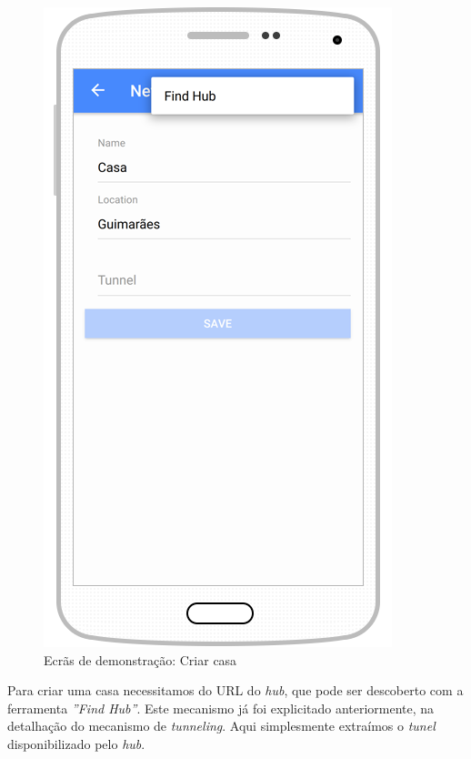 \begin{figure}[H]
  \centering
        \includegraphics[scale=0.75]{img/demo/create_home.png}
  \caption{Ecrãs de demonstração: Criar casa}
\end{figure}

Para criar uma casa necessitamos do URL do \textit{hub}, que pode ser descoberto com a ferramenta \textit{''Find Hub''}. Este mecanismo já foi explicitado anteriormente, na detalhação do mecanismo de \textit{tunneling}. Aqui simplesmente extraímos o \textit{tunel} disponibilizado pelo \textit{hub}.

